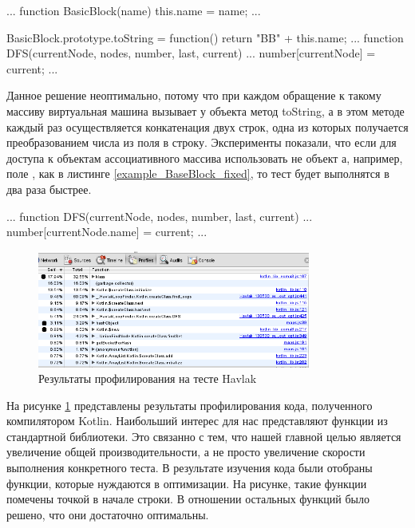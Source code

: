 \begin{code}
\begin{JavaScript}[caption=Пример неоптимального использования ассоциативного массива на JavaScript, label=example_BaseBlock]
...
function BasicBlock(name)
{
  this.name = name;
  ...
}

BasicBlock.prototype.toString = function() {
  return "BB" + this.name;
}
...
function DFS(currentNode, nodes, number, last, current) {
...
  number[currentNode] = current;
...
}
\end{JavaScript}
\end{code}

Данное решение неоптимально, потому что при каждом обращение к такому массиву виртуальная машина вызывает у объекта метод toString, а в этом методе каждый раз осуществляется конкатенация двух строк, одна из которых получается преобразованием числа из поля  в строку. Эксперименты показали, что если для доступа к объектам ассоциативного массива использовать не объект а, например, поле , как в листинге \ref{example_BaseBlock_fixed}, то тест будет выполнятся в два раза быстрее.

\begin{code}
\begin{JavaScript}[caption=Пример улучшения использования ассоциативного массива в тесте на JavaScript, label=example_BaseBlock_fixed]
...
function DFS(currentNode, nodes, number, last, current) {
...
  number[currentNode.name] = current;
...
}
\end{JavaScript}
\end{code}

\begin{figure}[ht!]
\centering
\includegraphics[width=0.8\textwidth]{img/havlak_0_profile.png}
\caption{Результаты профилирования на тесте Havlak}
\label{havlak_0_profile}
\end{figure}

На рисунке \ref{havlak_0_profile} представлены результаты профилирования кода, полученного компилятором Kotlin. Наибольший интерес для нас представляют функции из стандартной библиотеки. Это связанно с тем, что нашей главной целью является увеличение общей производительности, а не просто увеличение скорости выполнения конкретного теста. В результате изучения кода были отобраны функции, которые нуждаются в оптимизации. На рисунке, такие функции помечены точкой в начале строки. В отношении остальных функций было решено, что они достаточно оптимальны.

